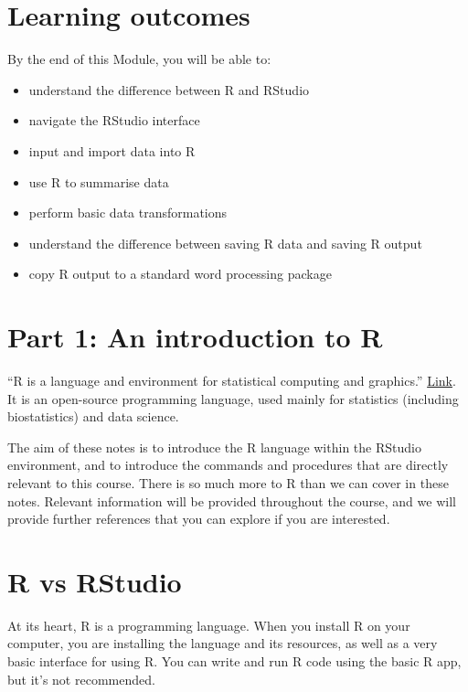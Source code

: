\documentclass[
]{memoir}
\providecommand{\tightlist}{%
  \setlength{\itemsep}{0pt}\setlength{\parskip}{0pt}}
\begin{document}
\hypertarget{learning-outcomes}{%
\section*{Learning outcomes}\label{learning-outcomes}}

By the end of this Module, you will be able to:

\begin{itemize}
\tightlist
\item
  understand the difference between R and RStudio
\item
  navigate the RStudio interface
\item
  input and import data into R
\item
  use R to summarise data
\item
  perform basic data transformations
\item
  understand the difference between saving R data and saving R output
\item
  copy R output to a standard word processing package
\end{itemize}

\hypertarget{part-1-an-introduction-to-r}{%
\section*{Part 1: An introduction to R}\label{part-1-an-introduction-to-r}}

``R is a language and environment for statistical computing and graphics.'' \href{https://www.r-project.org/about.html}{Link}. It is an open-source programming language, used mainly for statistics (including biostatistics) and data science.

The aim of these notes is to introduce the R language within the RStudio environment, and to introduce the commands and procedures that are directly relevant to this course. There is so much more to R than we can cover in these notes. Relevant information will be provided throughout the course, and we will provide further references that you can explore if you are interested.

\hypertarget{r-vs-rstudio}{%
\section{R vs RStudio}\label{r-vs-rstudio}}

At its heart, R is a programming language. When you install R on your computer, you are installing the language and its resources, as well as a very basic interface for using R. You can write and run R code using the basic R app, but it's not recommended.
\end{document}
